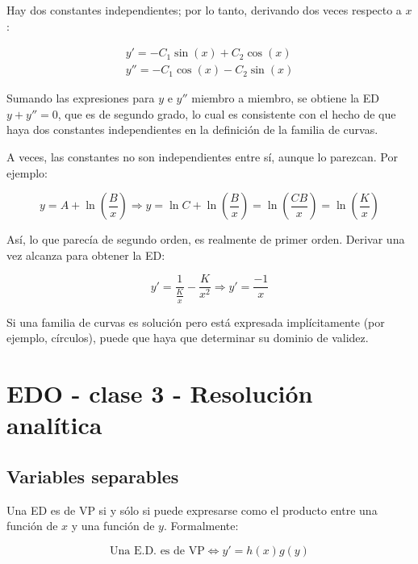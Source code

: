 \documentclass{article}
\begin{document}
Hay dos constantes independientes; por lo tanto, derivando dos veces respecto a $x$:

\begin{subequations}
\begin{align}
y' = -C_1 \sin(x) + C_2 \cos(x) \\
y'' = -C_1 \cos(x) - C_2 \sin(x)
\end{align}
\end{subequations}

Sumando las expresiones para $y$ e $y''$ miembro a miembro, se obtiene la ED $y + y'' = 0$, que es de segundo grado, lo cual es consistente con el hecho de que haya dos constantes independientes en la definición de la familia de curvas.

A veces, las constantes no son independientes entre sí, aunque lo parezcan. Por ejemplo:

\begin{equation}
y = A + \ln \left( \frac{B}{x} \right) \Rightarrow y = \ln C + \ln \left( \frac{B}{x} \right) = \ln \left( \frac{C B}{x} \right) = \ln \left( \frac{K}{x} \right)
\end{equation}

Así, lo que parecía de segundo orden, es realmente de primer orden. Derivar una vez alcanza para obtener la ED:

\begin{equation}
y' = \frac{1}{\frac{K}{x}} -\frac{K}{x^2} \Rightarrow y' = \frac{-1}{x}
\end{equation}

Si una familia de curvas es solución pero está expresada implícitamente (por ejemplo, círculos), puede que haya que determinar su dominio de validez.

\section{EDO - clase 3 - Resolución analítica}

\subsection{Variables separables}

Una ED es de VP si y sólo si puede expresarse como el producto entre una función de $x$ y una función de $y$. Formalmente:

\begin{equation}
\text{Una E.D. es de VP} \Leftrightarrow y' = h(x) g(y)
\end{equation}
\end{document}
